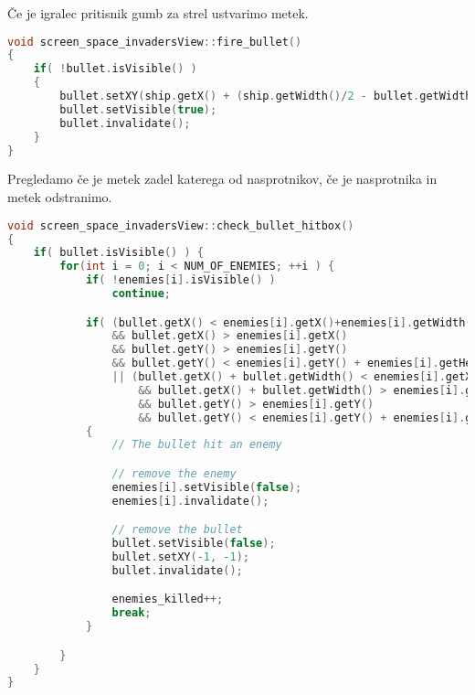 \documentclass{article}
\begin{document}
\noindent
\v{C}e je igralec pritisnik gumb za strel ustvarimo metek.
\begin{lstlisting}[language=c++]
void screen_space_invadersView::fire_bullet()
{
	if( !bullet.isVisible() )
	{
		bullet.setXY(ship.getX() + (ship.getWidth()/2 - bullet.getWidth()/2), ship.getY() - bullet.getHeight()/2);
		bullet.setVisible(true);
		bullet.invalidate();
	}
}
\end{lstlisting}

\noindent
Pregledamo \v{c}e je metek zadel katerega od nasprotnikov, \v{c}e je
nasprotnika in metek odstranimo.
\begin{lstlisting}[language=c++]
void screen_space_invadersView::check_bullet_hitbox()
{
	if( bullet.isVisible() ) {
		for(int i = 0; i < NUM_OF_ENEMIES; ++i ) {
			if( !enemies[i].isVisible() )
				continue;

			if( (bullet.getX() < enemies[i].getX()+enemies[i].getWidth()
				&& bullet.getX() > enemies[i].getX()
				&& bullet.getY() > enemies[i].getY()
				&& bullet.getY() < enemies[i].getY() + enemies[i].getHeight())
				|| (bullet.getX() + bullet.getWidth() < enemies[i].getX()+enemies[i].getWidth()
					&& bullet.getX() + bullet.getWidth() > enemies[i].getX()
					&& bullet.getY() > enemies[i].getY()
					&& bullet.getY() < enemies[i].getY() + enemies[i].getHeight())	)
			{
				// The bullet hit an enemy

				// remove the enemy
				enemies[i].setVisible(false);
				enemies[i].invalidate();

				// remove the bullet
				bullet.setVisible(false);
				bullet.setXY(-1, -1);
				bullet.invalidate();

				enemies_killed++;
				break;
			}

		}
	}
}
\end{lstlisting}
\end{document}
